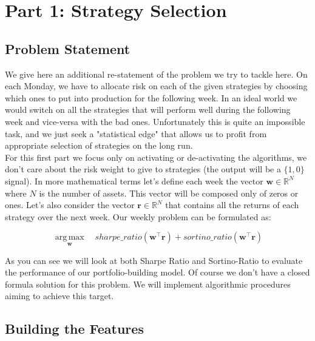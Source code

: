 \documentclass[12pt]{article} %
\DeclareMathOperator*{\argmax}{arg\,max}
\numberwithin{equation}{subsection}
\begin{document}



\newpage

\section{Part 1: Strategy Selection}

\subsection{Problem Statement}

We give here an additional re-statement of the problem we try to tackle here. On each Monday, we have to allocate risk on each of the given strategies by choosing which ones to put into production for the following week. In an ideal world we would switch on all the strategies that will perform well during the following week and vice-versa with the bad ones. Unfortunately this is quite an impossible task, and we just seek a "statistical edge" that allows us to profit from appropriate selection of strategies on the long run.\\
For this first part we focus only on activating or de-activating the algorithms, we don't care about the risk weight to give to strategies (the output will be a $\{1,0\}$ signal). In more mathematical terms let's define each week the vector $\mathbf{w} \in \mathbb{R}^N$ where $N$ is the number of assets. This vector will be composed only of zeros or ones. Let's also consider the vector $\mathbf{r} \in \mathbb{R}^N$ that contains all the returns of each strategy over the next week. Our weekly problem can be formulated as:


\begin{equation} \label{problem_statement}
\argmax \limits_{\mathbf{w}} \quad sharpe\_ratio(\mathbf{w}^\top\mathbf{r}) + sortino\_ratio(\mathbf{w}^\top\mathbf{r})
\end{equation}

As you can see we will look at both Sharpe Ratio and Sortino-Ratio to evaluate the performance of our portfolio-building model.
Of course we don't have a closed formula solution for this problem. We will implement algorithmic procedures aiming to achieve this target.\\


\subsection{Building the Features}
\end{document}
